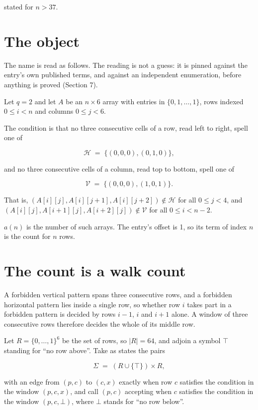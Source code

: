 \documentclass[11pt]{article}
\theoremstyle{definition}
\begin{document}
stated for $n > 37$.

\section{The object}

The name is read as follows. The reading is not a guess: it is pinned against the entry's own published terms, and against an independent enumeration, before anything is proved (Section 7).

Let $q = 2$ and let $A$ be an $n \times 6$ array with entries in $\{0,1,\dots,1\}$, rows indexed $0 \le i < n$ and columns $0 \le j < 6$.

The condition is that no three consecutive cells of a row, read left to right, spell one of

\[\mathcal{H} \;=\; \{(0,0,0), (0,1,0)\},\]

and no three consecutive cells of a column, read top to bottom, spell one of

\[\mathcal{V} \;=\; \{(0,0,0), (1,0,1)\}.\]

That is, $(A[i][j],A[i][j{+}1],A[i][j{+}2]) \notin \mathcal{H}$ for all $0 \le j < 4$, and $(A[i][j],A[i{+}1][j],A[i{+}2][j]) \notin \mathcal{V}$ for all $0 \le i < n-2$.

$a(n)$ is the number of such arrays. The entry's offset is 1, so its term of index $n$ is the count for $n$ rows.

\section{The count is a walk count}

A forbidden vertical pattern spans three consecutive rows, and a forbidden horizontal pattern lies inside a single row, so whether row $i$ takes part in a forbidden pattern is decided by rows $i-1$, $i$ and $i+1$ alone. A window of three consecutive rows therefore decides the whole of its middle row.

Let $R = \{0,\dots,1\}^{6}$ be the set of rows, so $|R| = 64$, and adjoin a symbol $\top$ standing for ``no row above''. Take as states the pairs

\[\Sigma \;=\; (R \cup \{\top\}) \times R,\]

with an edge from $(p,c)$ to $(c,x)$ exactly when row $c$ satisfies the condition in the window $(p,c,x)$, and call $(p,c)$ accepting when $c$ satisfies the condition in the window $(p,c,\bot)$, where $\bot$ stands for ``no row below''.
\end{document}
